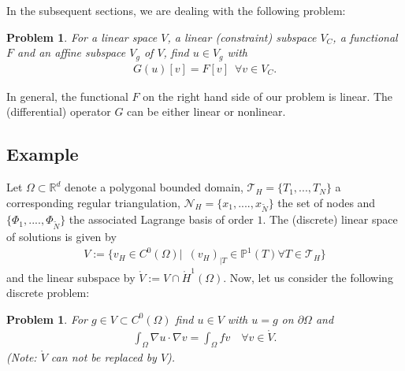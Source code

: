 \documentclass[a4paper,11pt]{article}
\numberwithin{equation}{section}
\newtheorem{problem}[definition]{Problem}
\begin{document}
  In the subsequent sections, we are dealing with the following problem: 

  \begin{problem}
  For a linear space $V$, a linear (constraint) subspace $V_C$, a functional $F$ and an affine subspace $V_g$ of $V$, find $u \in V_g$ with
  \begin{align*}
  G(u)[v] = F[v] \enspace \forall v \in V_C.
  \end{align*}
  \end{problem}
  In general, the functional $F$ on the right hand side of our problem is linear. The (differential) operator $G$ can be either linear or nonlinear.

  \subsection{Example}

  Let $\Omega \subset \mathbb{R}^d$ denote a polygonal bounded domain, $\mathcal{T}_H = \{ T_1, ..., T_N \}$ a corresponding regular triangulation, $\mathcal{N}_H = \{ x_1, ...., x_{\tilde{N}}\}$ the set of nodes and $\{ \Phi_1, ...., \Phi_{\tilde{N}}\}$ the associated Lagrange basis of order $1$. The (discrete) linear space of solutions is given by
  \begin{align*}
  V := \{ v_H \in C^0(\Omega)| \enspace (v_H)_{|T}\in \mathbb{P}^1(T) \forall T \in \mathcal{T}_H \}
  \end{align*}
  and the linear subspace by $\mathring{V} := V \cap \mathring{H}^1(\Omega)$. Now, let us consider the following discrete problem:
  \begin{problem}
  For $g \in V \subset C^0(\Omega)$ find $u \in V$ with $u=g$ on $\partial \Omega$ and
  \begin{align*}
  \int_{\Omega} \nabla u \cdot \nabla v = \int_{\Omega} f v \quad \forall v \in \mathring{V}.
  \end{align*}
  (Note: $\mathring{V}$ can not be replaced by $V$).
  \end{problem}
\end{document}
